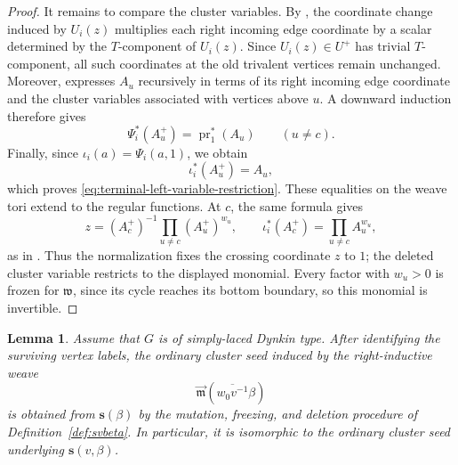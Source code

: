 \documentclass[12pt, reqno]{amsart}
\theoremstyle{plain}
\newtheorem{lemma}[theorem]{Lemma}
\theoremstyle{definition}
\numberwithin{equation}{section}
\begin{document}
\begin{proof}
It remains to compare the cluster variables. By
\cite[Lemma~4.2]{casals2025cluster}, the coordinate change induced
by \(U_i(z)\) multiplies each right incoming edge coordinate by a
scalar determined by the \(T\)-component of \(U_i(z)\). Since
\(U_i(z)\in U^+\) has trivial \(T\)-component, all such coordinates
at the old trivalent vertices remain unchanged. Moreover,
\cite[Equation~(25)]{casals2025cluster} expresses \(A_u\)
recursively in terms of its right incoming edge coordinate and the
cluster variables associated with vertices above \(u\). A downward
induction therefore gives
\[
\Psi_i^*(A_u^+)=\operatorname{pr}_1^*(A_u)
\qquad (u\neq c).
\]
Finally, since \(\iota_i(a)=\Psi_i(a,1)\), we obtain
\[
\iota_i^*(A_u^+)=A_u,
\]
which proves
\eqref{eq:terminal-left-variable-restriction}.
These equalities on the weave tori extend to the regular functions.
At \(c\), the same formula gives
\[
z=(A_c^+)^{-1}\prod_{u\ne c}(A_u^+)^{w_u},
\qquad
\iota_i^*(A_c^+)=\prod_{u\ne c}A_u^{w_u},
\]
as in \cite[Lemma~5.26 and Equation~(32)]{casals2025cluster}.
Thus the normalization fixes the crossing coordinate \(z\) to \(1\);
the deleted cluster variable restricts to the displayed monomial.
Every factor with \(w_u>0\) is frozen for \(\mathfrak w\), since its
cycle reaches its bottom boundary, so this monomial is invertible.
\end{proof}

\begin{lemma}\label{lem:inductivewave}
Assume that \(G\) is of simply-laced Dynkin type. After identifying
the surviving vertex labels, the ordinary cluster seed induced by the
right-inductive weave
\[
\overrightarrow{\mathfrak m}(\overline{w_0v^{-1}}\beta)
\]
is obtained from \(\mathbf{s}(\beta)\) by the mutation, freezing, and deletion
procedure of Definition~\ref{def:svbeta}. In particular, it is isomorphic
to the ordinary cluster seed underlying \(\mathbf{s}(v,\beta)\).
\end{lemma}
\end{document}
